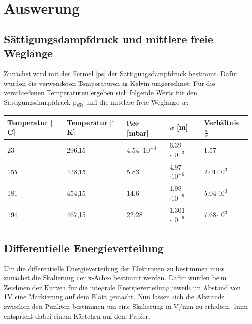 \section{Auswerung}

\subsection{Sättigungsdampfdruck und mittlere freie Weglänge}

Zunächst wird mit der Formel \ref{ps} der Sättigungsdampfdruck bestimmt.
Dafür wurden die verwendeten Temperaturen in Kelvin umgerechnet.
Für die verschiedenen Temperaturen ergeben sich folgende Werte für den Sättigungsdampfdruck p\textsubscript{sät} und die mittlere freie Weglänge $\bar w$:

\begin{minipage}{\linewidth}
    \begin{table}[H]
        \centering
    \begin{tabular}{lllll}
        \toprule
        Temperatur [$^\circ$C] & Temperatur [$^\circ$K] & p\textsubscript{sät} [mbar] & $\bar w$ [m] & Verhältnis $\frac{a}{\bar w} $\\
        \midrule
        23  & 296,15 & $4.54 \cdot 10^{-3}$ & 6.39 $\cdot 10^{-3}$ & 1.57 \\
        155 & 428,15 & 5.83 & 4.97 $\cdot 10^{-6}$ & 2.01$\cdot 10^{3}$ \\
        181 & 454,15 & 14.6 & 1.98 $\cdot 10^{-6}$ & 5.04$\cdot 10^{3}$ \\
        194 & 467,15 & 22.28 & 1.301$\cdot 10^{-6}$ & 7.68$\cdot 10^{3}$ \\
        \bottomrule
        
    \end{tabular}
    
    \label{tab:0}
    \end{table}
    \end{minipage}

\subsection{Differentielle Energieverteilung}

Um die differentielle Energieverteilung der Elektronen zu bestimmen muss zunächst die Skalierung der x-Achse bestimmt werden.
Dafür wurden beim Zeichnen der Kurven für die integrale Energieverteilung jeweils im Abstand von 1V eine Markierung auf dem Blatt gemacht.
Nun lassen sich die Abstände zwischen den Punkten bestimmen um eine Skalierung in V/mm zu erhalten. 1mm entspricht dabei einem Kästchen auf dem Papier.

